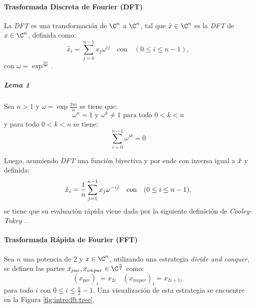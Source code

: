 \paragraph{Trasformada Discreta de Fourier (DFT)}
La \textit{DFT} es una transformación de $\C^{n}$ a $\C^{n}$, tal que $\hat{x}\in\C^{n}$ es la \textit{DFT} de $x\in\C^{n}$, definida como:
\begin{equation}
    \hat{x}_{i}=\sum^{n-1}_{j=0}{x_{j}\omega^{ij}} \quad \text{con} \quad (0\leq i\leq n-1),
\end{equation}
con $\omega=\exp^{\frac{2\pi i}{n}}$.

\subparagraph{Lema 1}Sea $n>1$ y $\omega=\exp{\frac{2\pi i}{n}}$ se tiene que:
\begin{equation}
    \omega^{n}=1 \text{ y } \omega^{k} \neq 1 \text{ para todo } 0<k<n
\end{equation}
y para todo $0<k<n$ se tiene:
\begin{equation}
    \sum^{n-1}_{i=0}{\omega^{ik}}=0
\end{equation}

Luego, asumiendo \textit{DFT} una función biyectiva y por ende con inversa igual a $\Check{x}$ y definida:
\begin{equation}
    \Check{x}_{i} = \frac{1}{n}\sum^{n-1}_{j=1}{x_{j}\omega^{-ij}} \quad \text{con} \quad (0\leq i\leq n-1),
\end{equation}
se tiene que su evaluación rápida viene dada por la siguiente definición de \textit{Cooley-Tukey}~\cite{Cooley1965AnAF}.

\paragraph{Trasformada Rápida de Fourier (FFT)}
Sea $n$ una potencia de 2 y $x\in\C^{n}$, utilizando una estrategia \textit{divide and conquer}, se definen las partes $x_{par},x_{impar}\in\C^{\frac{n}{2}}$ como:
\begin{equation}
    (x_{par})_{i} = x_{2i} \quad (x_{impar})_{i} = x_{2i+1},
\end{equation}
para todo $i$ con $0\leq i \leq \frac{n}{2}-1$. Una visualización de esta estrategia se encuentre en la Figura \ref{fig:intro:fft:tree}.\\

